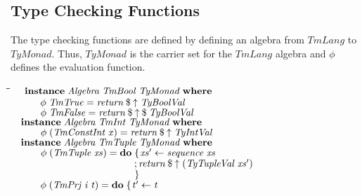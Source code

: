 \documentclass[10pt]{article}
\newlength{\lwidth}\setlength{\lwidth}{4.5cm}
\newlength{\cwidth}\setlength{\cwidth}{8mm} %
\newcommand{\Conid}[1]{\mathit{#1}}
\newcommand{\Varid}[1]{\mathit{#1}}
\begin{document}
\subsection{Type Checking Functions}

The type checking functions are defined by defining an algebra from
\ensuremath{\Conid{TmLang}} to \ensuremath{\Conid{TyMonad}}.  Thus, \ensuremath{\Conid{TyMonad}} is the carrier set for the
\ensuremath{\Conid{TmLang}} algebra and \ensuremath{\Varid{\phi}} defines the evaluation function.

\begin{tabbing}
\qquad\=\hspace{\lwidth}\=\hspace{\cwidth}\=\+\kill
${\hskip1.00em\relax\mathbf{instance}\;\Conid{Algebra}\;\Conid{TmBool}\;\Conid{TyMonad}\;\mathbf{where}}$\\
${\hskip1.00em\relax\hskip2.00em\relax\Varid{\phi}\;\Conid{TmTrue}\mathrel{=}\Varid{return}\mathbin{\$}\Varid{\uparrow}\;\Conid{TyBoolVal}}$\\
${\hskip1.00em\relax\hskip2.00em\relax\Varid{\phi}\;\Conid{TmFalse}\mathrel{=}\Varid{return}\mathbin{\$}\Varid{\uparrow}\mathbin{\$}\Conid{TyBoolVal}}$\\
${}$\\
${\hskip1.00em\relax\mathbf{instance}\;\Conid{Algebra}\;\Conid{TmInt}\;\Conid{TyMonad}\;\mathbf{where}}$\\
${\hskip1.00em\relax\hskip2.00em\relax\Varid{\phi}\;(\Conid{TmConstInt}\;\Varid{x})\mathrel{=}\Varid{return}\mathbin{\$}\Varid{\uparrow}\;\Conid{TyIntVal}}$\\
${}$\\
${\hskip1.00em\relax\mathbf{instance}\;\Conid{Algebra}\;\Conid{TmTuple}\;\Conid{TyMonad}\;\mathbf{where}}$\\
${\hskip1.00em\relax\hskip2.00em\relax\Varid{\phi}\;(\Conid{TmTuple}\;\Varid{xs})\mathrel{=}\mathbf{do}\;\{\mskip1.5mu \Varid{xs'}\leftarrow \Varid{sequence}\;\Varid{xs}}$\\
${\hskip1.00em\relax\hskip2.00em\relax\phantom{\Varid{\phi}\;(\Conid{TmTuple}\;\Varid{xs})\mathrel{=}\mathbf{do}\;\mbox{}};\Varid{return}\mathbin{\$}\Varid{\uparrow}\;(\Conid{TyTupleVal}\;\Varid{xs'})}$\\
${\hskip1.00em\relax\hskip2.00em\relax\phantom{\Varid{\phi}\;(\Conid{TmTuple}\;\Varid{xs})\mathrel{=}\mathbf{do}\;\mbox{}}\mskip1.5mu\}}$\\
${}$\\
${\hskip1.00em\relax\hskip2.00em\relax\Varid{\phi}\;(\Conid{TmPrj}\;\Varid{i}\;\Varid{t})\mathrel{=}\mathbf{do}\;\{\mskip1.5mu \Varid{t'}\leftarrow \Varid{t}}$\\

\end{tabbing}
\end{document}
